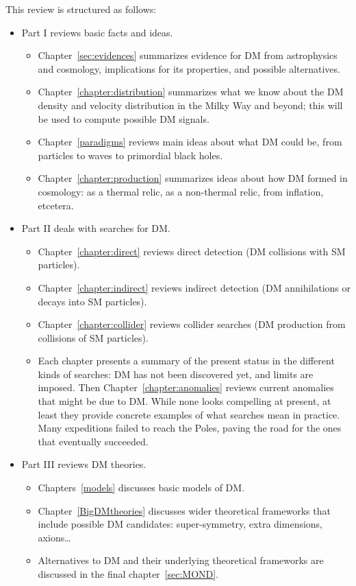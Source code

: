 This review is structured as follows:
\begin{itemize}
\item Part I reviews basic facts and ideas.
\begin{itemize}
\item Chapter~\ref{sec:evidences} summarizes evidence for DM from astrophysics and cosmology,
implications for its properties, and possible alternatives.

\item Chapter~\ref{chapter:distribution} summarizes what we know about the DM density and velocity distribution in the Milky Way and beyond; this will be used to compute possible DM signals.

\item Chapter~\ref{paradigms} reviews main ideas about what DM could be, from particles to waves to
primordial black holes.






\item Chapter~\ref{chapter:production} summarizes ideas about how DM formed in cosmology:
as a thermal relic, as a non-thermal relic, from inflation, etcetera.
\end{itemize}
\item Part II deals with searches for DM.
\begin{itemize}
\item Chapter~\ref{chapter:direct} reviews direct detection (DM collisions with SM particles).
\item Chapter~\ref{chapter:indirect} reviews indirect detection (DM annihilations or decays into SM particles).
\item Chapter~\ref{chapter:collider} reviews collider searches (DM production from collisions of SM particles).
\item Each chapter presents a summary of the present status in the different kinds of searches: DM has not been discovered yet, and limits are imposed. 
Then Chapter~\ref{chapter:anomalies} reviews current anomalies that might be due to DM.
While none looks compelling at present, at least they provide concrete examples of what searches mean in practice.
Many expeditions failed to reach the Poles, paving the road for the ones that eventually succeeded.

\end{itemize}
\item Part III reviews DM theories. 
\begin{itemize}
\item Chapters~\ref{models} discusses basic models of DM.
\item Chapter~\ref{BigDMtheories} discusses wider theoretical frameworks
that include possible DM candidates: super-symmetry, extra dimensions, axions\ldots
\item Alternatives to DM and their underlying theoretical frameworks are discussed in the final chapter~\ref{sec:MOND}.
\end{itemize}
\end{itemize}

